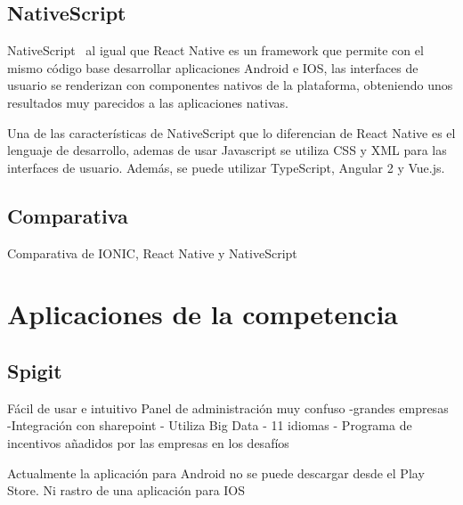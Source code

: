 \subsection{NativeScript}

NativeScript~\cite{NATSCR} al igual que React Native es un framework que permite con el mismo código base desarrollar aplicaciones 
Android e IOS, las interfaces de usuario se renderizan con componentes nativos de la plataforma, obteniendo unos 
resultados muy parecidos a las aplicaciones nativas.

Una de las características de NativeScript que lo diferencian de React Native es el lenguaje de desarrollo, ademas de 
usar Javascript se utiliza CSS y XML para las interfaces de usuario. Además, se puede utilizar TypeScript, Angular 2 y
Vue.js.

\subsection{Comparativa}

\begin{table}[comparativa]
	\centering
	{\small
		
	}
	\caption[Comparativa de IONIC, React Native, NativeScript]
	{Comparativa de IONIC, React Native y NativeScript~\cite{comparativaHibridas}}
	\label{tab:comparativa}
\end{table}

\section{Aplicaciones de la competencia}
\subsection{Spigit}

Fácil de usar e intuitivo
Panel de administración muy confuso
-grandes empresas
-Integración con sharepoint
- Utiliza Big Data
- 11 idiomas
- Programa de incentivos añadidos por las empresas en los desafíos

Actualmente la aplicación para Android no se puede descargar desde el Play Store.
Ni rastro de una aplicación para IOS



